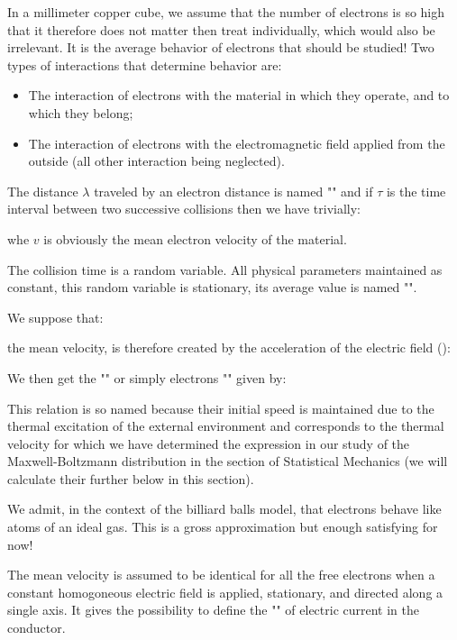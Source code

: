 	In a millimeter copper cube, we assume that the number of electrons is so high that it therefore does not matter then treat individually, which would also be irrelevant. It is the average behavior of electrons that should be studied! Two types of interactions that determine behavior are:
	
	\begin{itemize}
		\item The interaction of electrons with the material in which they operate, and to which they belong;
	
		\item The interaction of electrons with the electromagnetic field applied from the outside (all other interaction being neglected).
	\end{itemize}
	The distance $\lambda$ traveled by an electron distance is named "" and if $\tau$ is the time interval between two successive collisions then we have trivially:
	
	whe $v$ is obviously the mean electron velocity of the material.
	
	The collision time is a random variable. All physical parameters maintained as constant, this random variable is stationary, its average value is named "".
	
	We suppose that:
	
	the mean velocity, is therefore created by the acceleration of the electric field ():
	
	We then get the "" or simply electrons "" given by:
	
	This relation is so named because their initial speed is maintained due to the thermal excitation of the external environment and corresponds to the thermal velocity for which we have determined the expression in our study of the Maxwell-Boltzmann distribution in the section of Statistical Mechanics (we will calculate their further below in this section).
	
	We admit, in the context of the billiard balls model, that electrons behave like atoms of an ideal gas. This is a gross approximation but enough satisfying for now!
	
	The mean velocity is assumed to be identical for all the free electrons when a constant homogoneous electric field is applied, stationary, and directed along a single axis. It gives the possibility to define the "" of electric current in the conductor.
	
